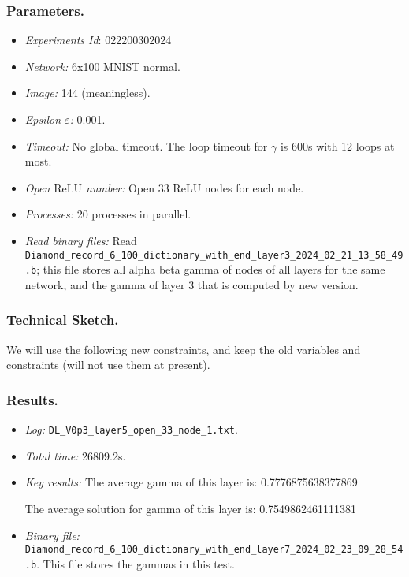 \documentclass{llncs}
\newcommand{\ReLU}{\mathrm{ReLU}}
\begin{document}
\subsubsection*{Parameters.}

\begin{itemize}
	\item\emph{Experiments Id}: 022200302024
	
	\item\emph{Network:} 6x100 MNIST normal. 
	
	\item\emph{Image:} 144 (meaningless).
	
	\item\emph{Epsilon $\varepsilon$:} 0.001.
	
	\item\emph{Timeout:} No global timeout. The loop timeout for $\gamma$ is 600s with 12 loops at most.
	
	\item\emph{Open $\ReLU$ number:} Open 33 ReLU nodes for each node.
	
	\item\emph{Processes:} 20 processes in parallel. 
	
	\item\emph{Read binary files:} Read \verb*|Diamond_record_6_100_dictionary_with_end_layer3_2024_02_21_13_58_49.b|; this file stores all alpha beta gamma of nodes of all layers for the same network, and the gamma of layer 3 that is computed by new version.
\end{itemize}


\subsubsection*{Technical Sketch.}

We will use the following new constraints, and keep the old variables and constraints (will not use them at present).

\subsubsection*{Results.}

\begin{itemize}
	\item \emph{Log:} \verb*|DL_V0p3_layer5_open_33_node_1.txt|.
	
	\item \emph{Total time:} 26809.2s.
	
	\item \emph{Key results:} The average gamma of this layer is:  0.7776875638377869
	
	The average solution for gamma of this layer is:  0.7549862461111381
	
	\item  \emph{Binary file:} \verb*|Diamond_record_6_100_dictionary_with_end_layer7_2024_02_23_09_28_54.b|. This file stores the gammas in this test.
	
\end{itemize}
\end{document}
